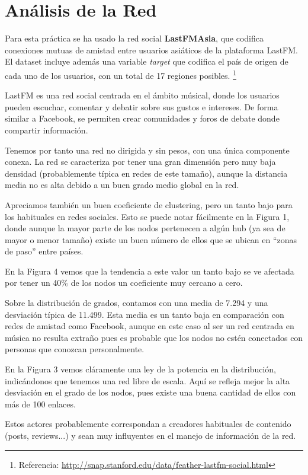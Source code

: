\section{Análisis de la Red}

Para esta práctica se ha usado la red social \textbf{LastFMAsia}, que codifica conexiones mutuas de amistad entre usuarios asiáticos de la plataforma LastFM. El dataset incluye además una variable \textit{target} que codifica el país de origen de cada uno de los usuarios, con un total de 17 regiones posibles. \footnote{Referencia: \url{http://snap.stanford.edu/data/feather-lastfm-social.html}}

LastFM es una red social centrada en el ámbito músical, donde los usuarios pueden escuchar, comentar y debatir sobre sus gustos e intereses. De forma similar a Facebook, se permiten crear comunidades y foros de debate donde compartir información.

\vspace{\baselineskip}

Tenemos por tanto una red no dirigida y sin pesos, con una única componente conexa. La red se caracteriza por tener una gran dimensión pero muy baja densidad (probablemente típica en redes de este tamaño), aunque la distancia media no es alta debido a un buen grado medio global en la red.

\vspace{\baselineskip}

Apreciamos también un buen coeficiente de clustering, pero un tanto bajo para los habituales en redes sociales. Esto se puede notar fácilmente en la Figura 1, donde aunque la mayor parte de los nodos pertenecen a algún hub (ya sea de mayor o menor tamaño) existe un buen número de ellos que se ubican en ``zonas de paso'' entre países.

En la Figura 4 vemos que la tendencia a este valor un tanto bajo se ve afectada por tener un 40\% de los nodos un coeficiente muy cercano a cero.

\vspace{\baselineskip}

Sobre la distribución de grados, contamos con una media de 7.294 y una desviación típica de 11.499. Esta media es un tanto baja en comparación con redes de amistad como Facebook, aunque en este caso al ser un red centrada en música no resulta extraño pues es probable que los nodos no estén conectados con personas que conozcan personalmente.

\vspace{\baselineskip}

En la Figura 3 vemos cláramente una ley de la potencia en la distribución, indicándonos que tenemos una red libre de escala. Aquí se refleja mejor la alta desviación en el grado de los nodos, pues existe una buena cantidad de ellos con más de 100 enlaces.

Estos actores probablemente correspondan a creadores habituales de contenido (posts, reviews...) y sean muy influyentes en el manejo de información de la red.